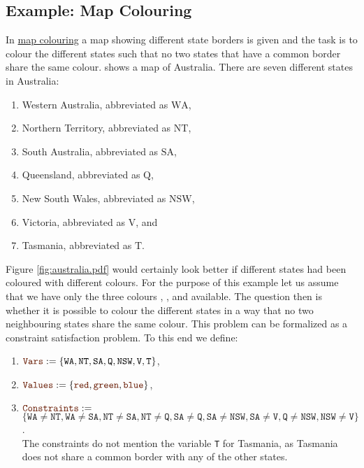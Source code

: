 \subsection{Example: Map Colouring}
In \href{https://en.wikipedia.org/wiki/Four_color_theorem}{map colouring}  a map showing
different state 
borders is given and the task is to colour the different states such that no two states that have a common
border share the same colour.   shows a map of Australia.  There are seven different
states in Australia:
\begin{enumerate}
\item Western Australia, abbreviated as $\mathrm{WA}$,
\item Northern Territory, abbreviated as $\mathrm{NT}$,
\item South Australia, abbreviated as $\mathrm{SA}$,
\item Queensland, abbreviated as $\mathrm{Q}$,
\item New South Wales, abbreviated as $\mathrm{NSW}$,
\item Victoria, abbreviated as $\mathrm{V}$, and
\item Tasmania, abbreviated as $\mathrm{T}$.
\end{enumerate}
Figure \ref{fig:australia.pdf} would certainly look better if different states had been coloured with different
colours.  For the purpose of 
this example let us assume that we have only the three colours , , and  
available.  The question then is whether it is  
possible to colour the different states in a way that no two neighbouring states share the same colour.  This
problem can be formalized as a constraint satisfaction problem.  To this end we define:
\begin{enumerate}
\item $\mytt{Vars} := \{ \mathtt{WA}, \mathtt{NT}, \mathtt{SA}, \mathtt{Q}, \mathtt{NSW}, \mathtt{V}, \mathtt{T} \}$,
\item $\mytt{Values} := \{ \mytt{red}, \mytt{green}, \mytt{blue} \}$,
\item $\mytt{Constraints} := $ \\[0.1cm]
      \hspace*{1.3cm}
      $\bigl\{ \mathtt{WA} \not= \mathtt{NT}, \mathtt{WA} \not= \mathtt{SA},
                 \mathtt{NT} \not= \mathtt{SA}, \mathtt{NT} \not= \mathtt{Q},
                 \mathtt{SA} \not= \mathtt{Q},  \mathtt{SA} \not= \mathtt{NSW}, \mathtt{SA} \not= \mathtt{V}, 
                 \mathtt{Q}  \not= \mathtt{NSW},
                 \mathtt{NSW}\not= \mathtt{V}
       \bigr\}
       $.
       \\[0.1cm]
       The constraints do not mention the variable \texttt{T} for Tasmania, as Tasmania does not share a common
       border with any of the other states.
\end{enumerate}
